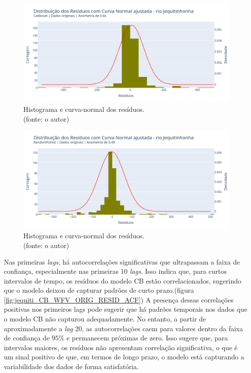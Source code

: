 \begin{figure}[!h]
\centering
\includegraphics[scale=0.33]{Figuras/jequiti/wfv/CB/CB_WFV_ORIG_RESID_x_CURVA_NORMAL.png}
\caption{Histograma e curva-normal dos resíduos.\\(fonte: o autor)}
\label{fig:jequiti_CB_WFV_ORIG_RESID_x_CURVA_NORMAL}
\end{figure}

\begin{figure}[!h]
\centering
\includegraphics[scale=0.33]{Figuras/jequiti/wfv/RF/RF_WFV_ORIG_RESID_x_CURVA_NORMAL.png}
\caption{Histograma e curva-normal dos resíduos.\\(fonte: o autor)}
\label{fig:jequiti_RF_WFV_ORIG_RESID_x_CURVA_NORMAL}
\end{figure}
\clearpage

Nas primeiras \textit{lags}, há autocorrelações significativas que ultrapassam a faixa de confiança, especialmente nas primeiras 10 \textit{lags}. Isso indica que, para curtos intervalos de tempo, os resíduos do modelo CB estão correlacionados, sugerindo que o modelo deixou de capturar padrões de curto prazo.(figura \ref{fig:jequiti_CB_WFV_ORIG_RESID_ACF}) A presença dessas correlações positivas nos primeiros lags pode sugerir que há padrões temporais nos dados que o modelo CB não capturou adequadamente. No entanto, a partir de aproximadamente a \textit{lag} 20, as autocorrelações caem para valores dentro da faixa de confiança de $95\%$ e permanecem próximas de zero. Isso sugere que, para intervalos maiores, os resíduos não apresentam correlação significativa, o que é um sinal positivo de que, em termos de longo prazo, o modelo está capturando a variabilidade dos dados de forma satisfatória.

